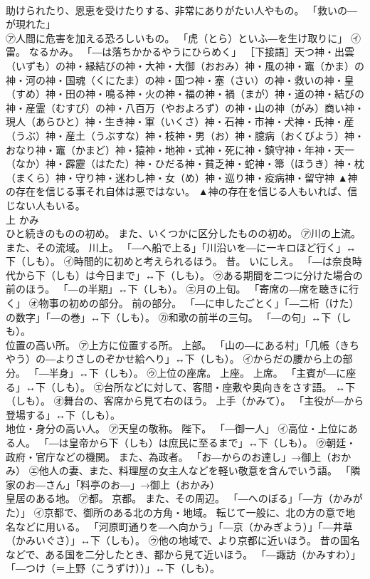 \documentclass[8pt]{extreport}
\begin{document}
\begin{CJK}{UTF8}{min}
\\	助けられたり、恩恵を受けたりする、非常にありがたい人やもの。 「救いの―が現れた」 
\\	㋐人間に危害を加える恐ろしいもの。 「虎（とら）といふ―を生け取りに」 ㋑雷。 なるかみ。 「―は落ちかかるやうにひらめく」 ［下接語］天つ神・出雲（いずも）の神・縁結びの神・大神・大御（おおみ）神・風の神・竈（かま）の神・河の神・国魂（くにたま）の神・国つ神・塞（さい）の神・救いの神・皇（すめ）神・田の神・鳴る神・火の神・福の神・禍（まが）神・道の神・結びの神・産霊（むすび）の神・八百万（やおよろず）の神・山の神（がみ）商い神・現人（あらひと）神・生き神・軍（いくさ）神・石神・市神・犬神・氏神・産（うぶ）神・産土（うぶすな）神・枝神・男（お）神・臆病（おくびよう）神・おなり神・竈（かまど）神・猿神・地神・式神・死に神・鎮守神・年神・天一（なか）神・霹靂（はたた）神・ひだる神・貧乏神・蛇神・箒（ほうき）神・枕（まくら）神・守り神・迷わし神・女（め）神・巡り神・疫病神・留守神	▲神の存在を信じる事それ自体は悪ではない。 ▲神の存在を信じる人もいれば、信じない人もいる。
\\	上	かみ	
\\	ひと続きのものの初め。 また、いくつかに区分したものの初め。 ㋐川の上流。 また、その流域。 川上。 「―へ船で上る」「川沿いを―に一キロほど行く」↔下（しも）。 ㋑時間的に初めと考えられるほう。 昔。 いにしえ。 「―は奈良時代から下（しも）は今日まで」↔下（しも）。 ㋒ある期間を二つに分けた場合の前のほう。 「―の半期」↔下（しも）。 ㋓月の上旬。 「寄席の―席を聴きに行く」 ㋔物事の初めの部分。 前の部分。 「―に申したごとく」「―二桁（けた）の数字」「―の巻」↔下（しも）。 ㋕和歌の前半の三句。 「―の句」↔下（しも）。 
\\	位置の高い所。 ㋐上方に位置する所。 上部。 「山の―にある村」「几帳（きちやう）の―よりさしのぞかせ給へり」↔下（しも）。 ㋑からだの腰から上の部分。 「―半身」↔下（しも）。 ㋒上位の座席。 上座。 上席。 「主賓が―に座る」↔下（しも）。 ㋓台所などに対して、客間・座敷や奥向きをさす語。 ↔下（しも）。 ㋔舞台の、客席から見て右のほう。 上手（かみて）。 「主役が―から登場する」↔下（しも）。 
\\	地位・身分の高い人。 ㋐天皇の敬称。 陛下。 「―御一人」 ㋑高位・上位にある人。 「―は皇帝から下（しも）は庶民に至るまで」↔下（しも）。 ㋒朝廷・政府・官庁などの機関。 また、為政者。 「お―からのお達し」→御上（おかみ） ㋓他人の妻、また、料理屋の女主人などを軽い敬意を含んでいう語。 「隣家のお―さん」「料亭のお―」→御上（おかみ） 
\\	皇居のある地。 ㋐都。 京都。 また、その周辺。 「―へのぼる」「―方（かみがた）」 ㋑京都で、御所のある北の方角・地域。 転じて一般に、北の方の意で地名などに用いる。 「河原町通りを―へ向かう」「―京（かみぎよう）」「―井草（かみいぐさ）」↔下（しも）。 ㋒他の地域で、より京都に近いほう。 昔の国名などで、ある国を二分したとき、都から見て近いほう。 「―諏訪（かみすわ）」「―つけ（＝上野（こうずけ））」↔下（しも）。 

\end{CJK}
\end{document}
